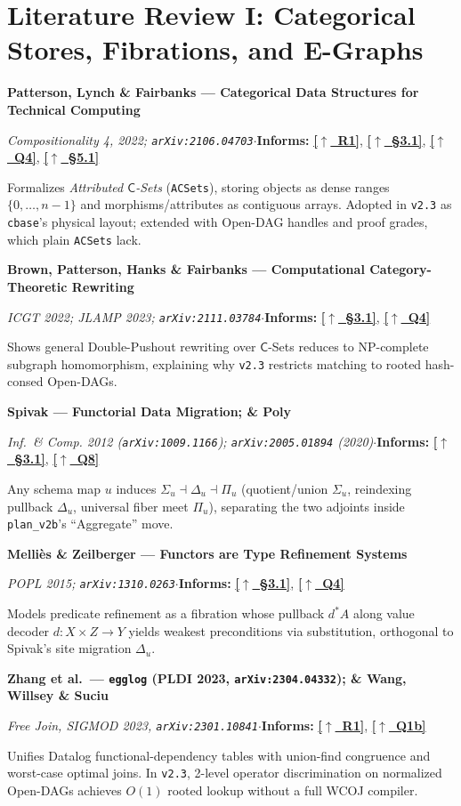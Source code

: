 \documentclass[12pt]{article}
\newcommand{\secback}[2]{\hyperref[#1]{\textcolor{linkblue}{\textbf{\small[\(\uparrow\)~#2]}}}}
\newcommand{\litentry}[4]{%
  \par\medskip\noindent\hypertarget{lit:#1}{}%
  \textbf{#2}\par\nopagebreak\noindent
  {\footnotesize\textit{#3}\quad$\cdot$\quad\textbf{Informs:} #4}\par\nopagebreak\smallskip\noindent\ignorespaces
}
\begin{document}
\appendix

\section{Literature Review I: Categorical Stores, Fibrations, and E-Graphs}
\label{sec:app-a}

\litentry{patterson2022}{Patterson, Lynch \& Fairbanks --- Categorical Data Structures for Technical Computing}{\emph{Compositionality} 4, 2022; \texttt{arXiv:2106.04703}}{\secback{sec:thesis}{R1}, \secback{sec:v2b-accounting}{\S3.1}, \secback{ans:4}{Q4}, \secback{sec:arch-store}{\S5.1}}
Formalizes \emph{Attributed $\mathsf{C}$-Sets} (\texttt{ACSets}), storing objects as dense ranges $\{0,\dots,n-1\}$ and morphisms/attributes as contiguous arrays. Adopted in \texttt{v2.3} as \texttt{cbase}'s physical layout; extended with Open-DAG handles and proof grades, which plain \texttt{ACSets} lack.

\litentry{brown2022}{Brown, Patterson, Hanks \& Fairbanks --- Computational Category-Theoretic Rewriting}{ICGT 2022; \emph{JLAMP} 2023; \texttt{arXiv:2111.03784}}{\secback{sec:v2b-accounting}{\S3.1}, \secback{ans:4}{Q4}}
Shows general Double-Pushout rewriting over $\mathsf{C}$-Sets reduces to NP-complete subgraph homomorphism, explaining why \texttt{v2.3} restricts matching to rooted hash-consed Open-DAGs.

\litentry{spivak2012}{Spivak --- Functorial Data Migration; \& Poly}{\emph{Inf.\ \& Comp.} 2012 (\texttt{arXiv:1009.1166}); \texttt{arXiv:2005.01894} (2020)}{\secback{sec:v2b-accounting}{\S3.1}, \secback{ans:8}{Q8}}
Any schema map $u$ induces $\Sigma_u \dashv \Delta_u \dashv \Pi_u$ (quotient/union $\Sigma_u$, reindexing pullback $\Delta_u$, universal fiber meet $\Pi_u$), separating the two adjoints inside \texttt{plan\_v2b}'s ``Aggregate'' move.

\litentry{mellies2015}{Melli\`es \& Zeilberger --- Functors are Type Refinement Systems}{POPL 2015; \texttt{arXiv:1310.0263}}{\secback{sec:v2b-accounting}{\S3.1}, \secback{ans:4}{Q4}}
Models predicate refinement as a fibration whose pullback $d^*A$ along value decoder $d : X \times Z \to Y$ yields weakest preconditions via substitution, orthogonal to Spivak's site migration $\Delta_u$.

\litentry{zhang2023}{Zhang et al.\ --- \texttt{egglog} (PLDI 2023, \texttt{arXiv:2304.04332}); \& \hypertarget{lit:wang2023}{}Wang, Willsey \& Suciu}{Free Join, SIGMOD 2023, \texttt{arXiv:2301.10841}}{\secback{sec:thesis}{R1}, \secback{ans:1b}{Q1b}}
Unifies Datalog functional-dependency tables with union-find congruence and worst-case optimal joins. In \texttt{v2.3}, 2-level operator discrimination on normalized Open-DAGs achieves $O(1)$ rooted lookup without a full WCOJ compiler.
\end{document}
